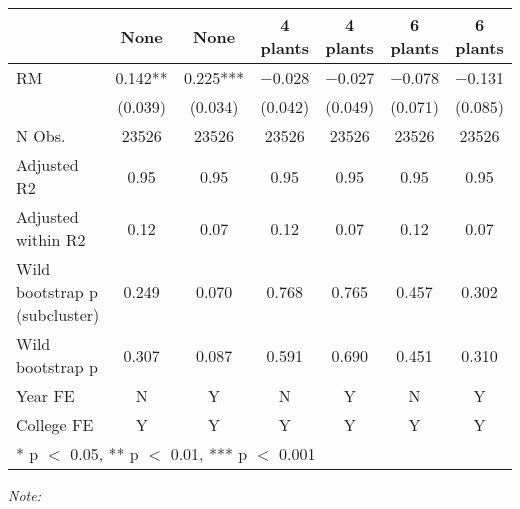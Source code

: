 \begin{table}
\centering
\begin{threeparttable}
\begin{tabular}[t]{lcccccc}
\toprule
  & None & None  & 4 plants & 4 plants  & 6 plants & 6 plants \\
\midrule
RM & \num{0.142}** & \num{0.225}*** & \num{-0.028} & \num{-0.027} & \num{-0.078} & \num{-0.131}\\
 & (\num{0.039}) & (\num{0.034}) & (\num{0.042}) & (\num{0.049}) & (\num{0.071}) & (\num{0.085})\\
\midrule
N Obs. & \num{23526} & \num{23526} & \num{23526} & \num{23526} & \num{23526} & \num{23526}\\
Adjusted R2 & \num{0.95} & \num{0.95} & \num{0.95} & \num{0.95} & \num{0.95} & \num{0.95}\\
Adjusted within R2 & \num{0.12} & \num{0.07} & \num{0.12} & \num{0.07} & \num{0.12} & \num{0.07}\\
Wild bootstrap p (subcluster) & 0.249 & 0.070 & 0.768 & 0.765 & 0.457 & 0.302\\
Wild bootstrap p & 0.307 & 0.087 & 0.591 & 0.690 & 0.451 & 0.310\\
Year FE & N & Y & N & Y & N & Y\\
College FE & Y & Y & Y & Y & Y & Y\\
\bottomrule
\multicolumn{7}{l}{\rule{0pt}{1em}* p $<$ 0.05, ** p $<$ 0.01, *** p $<$ 0.001}\\
\end{tabular}
\begin{tablenotes}
\item \textit{Note: } 
\item 
\end{tablenotes}
\end{threeparttable}
\end{table}
